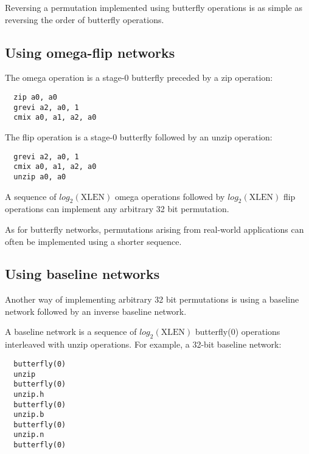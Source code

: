 Reversing a permutation implemented using butterfly operations is as simple as
reversing the order of butterfly operations.


\subsection{Using omega-flip networks}

The omega operation is a stage-0 butterfly preceded by a zip operation:

\begin{verbatim}
  zip a0, a0
  grevi a2, a0, 1
  cmix a0, a1, a2, a0
\end{verbatim}

The flip operation is a stage-0 butterfly followed by an unzip operation:

\begin{verbatim}
  grevi a2, a0, 1
  cmix a0, a1, a2, a0
  unzip a0, a0
\end{verbatim}

A sequence of $log_2(\textrm{XLEN})$ omega operations followed by
$log_2(\textrm{XLEN})$ flip operations can implement any arbitrary 32 bit
permutation.

As for butterfly networks, permutations arising from real-world applications
can often be implemented using a shorter sequence.


\subsection{Using baseline networks}

Another way of implementing arbitrary 32 bit permutations is using a
baseline network followed by an inverse baseline network.

A baseline network is a sequence of $log_2(\textrm{XLEN})$ butterfly(0)
operations interleaved with unzip operations. For example, a 32-bit
baseline network:

\begin{verbatim}
  butterfly(0)
  unzip
  butterfly(0)
  unzip.h
  butterfly(0)
  unzip.b
  butterfly(0)
  unzip.n
  butterfly(0)
\end{verbatim}

